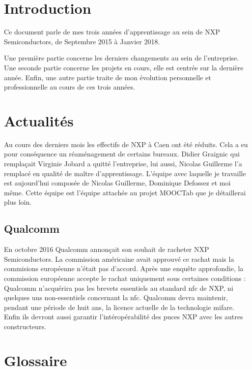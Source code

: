 \documentclass[french,11pt,a4paper,titlepage,openright,openbib]{report}
\begin{document}
\chapter{Introduction}

Ce document parle de mes trois années d'apprentissage au sein de NXP Semiconductors, de Septembre 2015 à Janvier 2018.

Une première partie concerne les derniers changements au sein de l'entreprise.
Une seconde partie concerne les projets en cours, elle est centrée sur la dernière année.
Enfin, une autre partie traite de mon évolution personnelle et professionnelle au cours de ces trois années.

\chapter{Actualités}

Au cours des derniers mois les effectifs de NXP à Caen ont été réduits. Cela a eu pour conséquence un réaménagement de certains bureaux.
Didier Graignic qui remplaçait Virginie Jobard a quitté l'entreprise, lui aussi, Nicolas Guillerme l'a remplacé en qualité de maître d'apprentissage.
L'équipe avec laquelle je travaille est aujourd'hui composée de Nicolas Guillerme, Dominique Defossez et moi même. Cette équipe est l'équipe attachée au projet MOOCTab que je détaillerai plus loin.


\section{Qualcomm}

En octobre 2016 Qualcomm annonçait son souhait de racheter NXP Semiconductors. La commission américaine avait approuvé ce rachat mais la commisions européenne n'était pas d'accord. Après une enquête approfondie, la commission européenne accepte le rachat uniquement sous certaines conditions :
Qualcomm n'acquérira pas les brevets essentiels au standard \gls{nfc} de NXP, ni quelques uns non-essentiels concernant la \gls{nfc}.
Qualcomm devra maintenir, pendant une période de huit ans, la licence actuelle de la technologie \gls{mifare}. Enfin ils devront aussi garantir l'intéropérabilité des puces NXP avec les autres constructeurs.

\chapter{Glossaire}


\printglossaries
\end{document}
